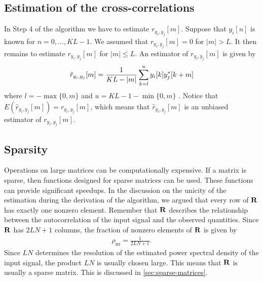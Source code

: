 \documentclass[a4paper, openany, oneside]{memoir}
\begin{document}
\subsection{Estimation of the cross-correlations}
\label{sub:reconstruction-estimation}
In Step 4 of the algorithm we have to estimate $r_{y_i,y_j}[m]$. Suppose that $y_i[n]$ is known for $n = 0,\ldots,KL-1$. We assumed that $r_{y_i,y_j}[m]=0$ for $|m|>L$. It then remains to estimate $r_{y_i,y_j}[m]$ for $|m| \le L$. An estimator of $r_{y_i,y_j}[m]$ is given by
\begin{align} \label{eq:ryij-est}
    \hat{r}_{y_i,y_j}[m] = \frac{1}{KL-|m|}\sum_{k=l}^{u}y_i[k]y^*_j[k+m]
\end{align}
where $l=-\max\{0,m\}$ and $u=KL-1-\min\{0,m\}$ \cite{hayes1996statistical}. Notice that $E(\hat{r}_{y_i,y_j}[m])=r_{y_i,y_j}[m]$, which means that $\hat{r}_{y_i,y_j}[m]$ is an unbiased estimator of $r_{y_i,y_j}[m]$.

\subsection{Sparsity}
\label{sub:reconstruction-sparsity}
Operations on large matrices can be computationally expensive. If a matrix is sparse, then functions designed for sparse matrices can be used. These functions can provide significant speedups. In the discussion on the unicity of the estimation during the derivation of the algorithm, we argued that every row of $\boldsymbol{\mathbf{R}}$ has exactly one nonzero element. Remember that $\boldsymbol{\mathbf{R}}$ describes the relationship between the autocorrelation of the input signal and the observed quantities. Since $\boldsymbol{\mathbf{R}}$ has $2LN+1$ columns, the fraction of nonzero elements of $\boldsymbol{\mathbf{R}}$ is given by
\begin{align*}
    \rho_{\text{nz}}=\frac{1}{2LN+1}.
\end{align*}
Since $LN$ determines the resolution of the estimated power spectral density of the input signal, the product $LN$ is usually chosen large. This means that $\boldsymbol{\mathbf{R}}$ is usually a sparse matrix. This is discussed in \cref{sec:sparse-matrices}.
\end{document}
